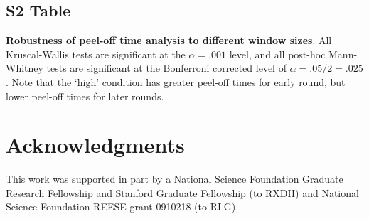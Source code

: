 \documentclass[10pt,letterpaper]{article}
\begin{document}
\subsection*{S2 Table}
\label{S2_Table}
{\bf Robustness of peel-off time analysis to different window sizes}. All Kruscal-Wallis tests are significant at the $\alpha = .001$ level, and all post-hoc Mann-Whitney tests are significant at the Bonferroni corrected level of $\alpha = .05/2 = .025$. Note that the `high' condition has greater peel-off times for early round, but lower peel-off times for later rounds.
 
\section*{Acknowledgments}
This work was supported in part by a National Science Foundation Graduate Research Fellowship and Stanford Graduate Fellowship (to RXDH) and National Science Foundation REESE grant 0910218 (to RLG)

\nolinenumbers

%
%
% 
\end{document}
